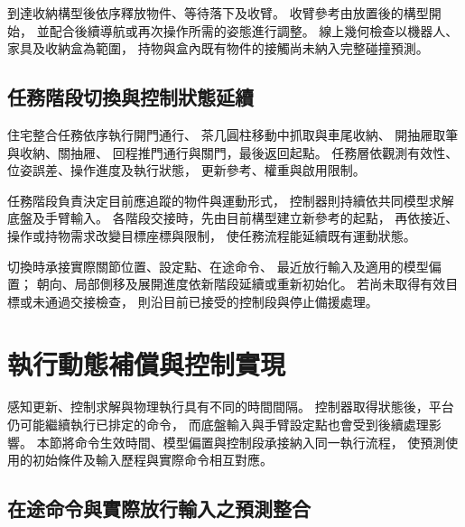 到達收納構型後依序釋放物件、等待落下及收臂。
收臂參考由放置後的構型開始，
並配合後續導航或再次操作所需的姿態進行調整。
線上幾何檢查以機器人、家具及收納盒為範圍，
持物與盒內既有物件的接觸尚未納入完整碰撞預測。

\subsection{任務階段切換與控制狀態延續}
\label{subsec:task_transition_continuity}

住宅整合任務依序執行開門通行、
茶几圓柱移動中抓取與車尾收納、
開抽屜取筆與收納、關抽屜、
回程推門通行與關門，最後返回起點。
任務層依觀測有效性、位姿誤差、操作進度及執行狀態，
更新參考、權重與啟用限制。

任務階段負責決定目前應追蹤的物件與運動形式，
控制器則持續依共同模型求解底盤及手臂輸入。
各階段交接時，先由目前構型建立新參考的起點，
再依接近、操作或持物需求改變目標座標與限制，
使任務流程能延續既有運動狀態。

切換時承接實際關節位置、設定點、在途命令、
最近放行輸入及適用的模型偏置；
朝向、局部側移及展開進度依新階段延續或重新初始化。
若尚未取得有效目標或未通過交接檢查，
則沿目前已接受的控制段與停止備援處理。

\section{執行動態補償與控制實現}
\label{sec:execution_compensation}

感知更新、控制求解與物理執行具有不同的時間間隔。
控制器取得狀態後，平台仍可能繼續執行已排定的命令，
而底盤輸入與手臂設定點也會受到後續處理影響。
本節將命令生效時間、模型偏置與控制段承接納入同一執行流程，
使預測使用的初始條件及輸入歷程與實際命令相互對應。

\subsection{在途命令與實際放行輸入之預測整合}
\label{subsec:queued_applied_command_prediction}

